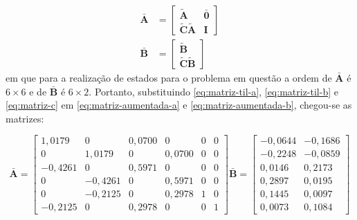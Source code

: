 \begin{subequations}
    \label{eq:matriz-a-e-b-aumentada}
    \begin{align}
        \mathbf{\bar{A}} &=
        \begin{bmatrix}
            \label{eq:matriz-aumentada-a}
            \mathbf{\tilde{A}} & \mathbf{\bar{0}}\\ 
            \mathbf{\tilde{C}}\mathbf{\tilde{A}} & \mathbf{I}
        \end{bmatrix}   \\
        \mathbf{\bar{B}} &=
        \begin{bmatrix}
            \label{eq:matriz-aumentada-b}
            \mathbf{\tilde{B}}\\ 
            \mathbf{\tilde{C}}\mathbf{\tilde{B}}
        \end{bmatrix}
    \end{align}
\end{subequations} em que para a realização de estados para o problema em
questão a ordem de $\mathbf{\bar{A}}$ é $6 \times 6$ e de $\mathbf{\bar{B}}$ é
$6 \times 2$. Portanto, substituindo \ref{eq:matriz-til-a},
\ref{eq:matriz-til-b} e \ref{eq:matriz-c} em \ref{eq:matriz-aumentada-a} e
\ref{eq:matriz-aumentada-b}, chegou-se as matrizes:

\begin{subequations}
        \begin{equation}
            \label{eq:matriz-aumentanda-a-com-valores}
            \mathbf{\bar{A}} =
            \begin{bmatrix}
                1,0179  &  0       &  0,0700  &  0       & 0       & 0      \\
                0       &  1,0179  &  0       &  0,0700  & 0       & 0      \\
                -0,4261 &  0       &  0,5971  &  0       & 0       & 0      \\
                0       &  -0,4261 &  0       &  0,5971  & 0       & 0      \\
                0       &  -0,2125 &  0       &  0,2978  & 1       & 0      \\
                -0,2125 &  0       &  0,2978  &  0       & 0       & 1
            \end{bmatrix}
        \end{equation}    
        \begin{equation}
            \label{eq:matriz-aumentanda-b-com-valores}
            \mathbf{\bar{B}} =
            \begin{bmatrix}
                -0,0644 & -0,1686 \\
                -0,2248 & -0,0859 \\
                0,0146 &  0,2173  \\
                0,2897 &  0,0195  \\
                0,1445 &  0,0097  \\
                0,0073 &  0,1084
            \end{bmatrix}
        \end{equation}
\end{subequations}

